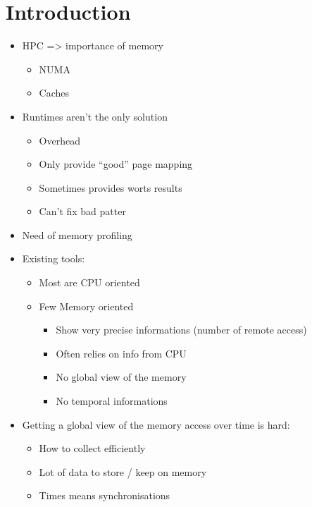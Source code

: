 \section{Introduction}
\label{sec:intro}

\begin{itemize}
    \item HPC => importance of memory
        \begin{itemize}
            \item NUMA
            \item Caches
        \end{itemize}
    \item Runtimes aren't the only solution
        \begin{itemize}
            \item Overhead
            \item Only provide ``good'' page mapping
            \item Sometimes provides worts results
            \item Can't fix bad patter
        \end{itemize}
    \item  Need of memory profiling
    \item Existing tools:
        \begin{itemize}
            \item Most are CPU oriented
            \item Few Memory oriented
                \begin{itemize}
                    \item Show very precise informations (number of remote
                        access)
                    \item Often relies on info from CPU
                    \item No global view of the memory
                    \item No temporal informations
                \end{itemize}
        \end{itemize}
    \item Getting a global view of the memory access over time is hard:
        \begin{itemize}
            \item How to collect efficiently
            \item Lot of data to store / keep on memory
            \item Times means synchronisations
        \end{itemize}
\end{itemize}
